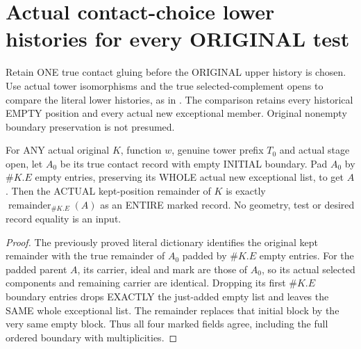 \section{Actual contact-choice lower histories for every ORIGINAL test}

Retain ONE true contact gluing before the ORIGINAL upper history is chosen.
Use actual tower isomorphisms and the true selected-complement opens to
compare the literal lower histories, as in
\cite[Sections~5 and~7]{bierstone-milman08-functoriality}.
The comparison retains every historical EMPTY position and every actual new
exceptional member. Original nonempty boundary preservation is not presumed.

\begin{lemma}
\label{hir:original-kept-contact-remainder-actual-empty-padding}
\leanok
For ANY actual original $K$, function $w$, genuine tower prefix $T_0$ and
actual stage open, let $A_0$ be its true contact record with empty INITIAL
boundary. Pad $A_0$ by $\#K.E$ empty entries, preserving its WHOLE actual
new exceptional list, to get $A$. Then the ACTUAL kept-position remainder
of $K$ is exactly $\operatorname{remainder}_{\#K.E}(A)$ as an ENTIRE marked
record. No geometry, test or desired record equality is an input.
\end{lemma}
\begin{proof}
The previously proved literal dictionary identifies the original kept
remainder with the true remainder of $A_0$ padded by $\#K.E$ empty entries.
For the padded parent $A$, its carrier, ideal and mark are those of $A_0$,
so its actual selected components and remaining carrier are identical.
Dropping its first $\#K.E$ boundary entries drops EXACTLY the just-added
empty list and leaves the SAME whole exceptional list. The remainder
replaces that initial block by the very same empty block. Thus all four
marked fields agree, including the full ordered boundary with multiplicities.
\end{proof}

